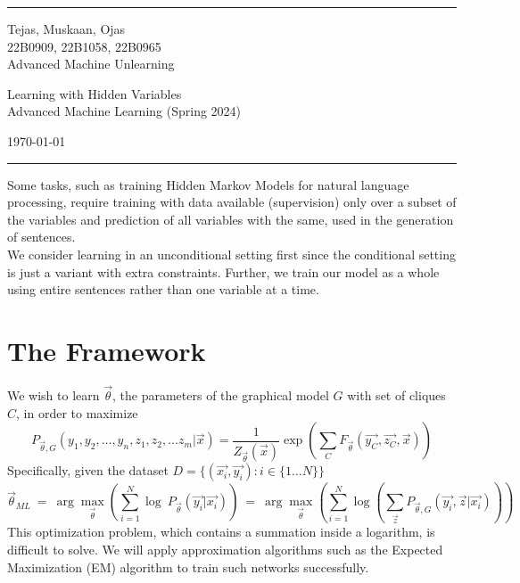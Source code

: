 \documentclass[a4paper]{article}
\begin{document}

\fancyhead[C]{}
\hrule \medskip %
\begin{minipage}{0.295\textwidth} 
\raggedright
\footnotesize
Tejas, Muskaan, Ojas \hfill\\   
22B0909, 22B1058, 22B0965\hfill\\
Advanced Machine Unlearning
\end{minipage}
\begin{minipage}{0.4\textwidth} 
\centering 
\large 
Learning with Hidden Variables\\ 
\normalsize 
Advanced Machine Learning (Spring 2024)\\ 
\end{minipage}
\begin{minipage}{0.295\textwidth} 
\raggedleft
\today\hfill\\
\end{minipage}
\medskip\hrule 
\bigskip


Some tasks, such as training Hidden Markov Models for natural language processing, require training with data available (supervision) only over a subset of the variables and prediction of all variables with the same, used in the generation of sentences. \hfill \\

We consider learning in an unconditional setting first since the conditional setting is just a variant with extra constraints. Further, we train our model as a whole using entire sentences rather than one variable at a time.

\section{The Framework}
We wish to learn $\vec{\theta}$, the parameters of the graphical model $G$ with set of cliques $C$, in order to maximize \[
P_{\vec{\theta}, G}\left( y_1, y_2, \dots, y_n, z_1, z_2, \dots z_m | \vec{x} \right) = 
\frac{1}{Z_{\vec{\theta}}(\vec{x})} \exp \left( \sum_{C} F_{\vec{\theta}}\left(\vec{y_C}, \vec{z_C}, \vec{x}\right) \right)
\] 
Specifically, given the dataset $D = \{ (\vec{x_i}, \vec{y_i}) : i \in \{ 1 \dots N \}  \}$  \[
\vec{\theta}_{ML}\ =\ 
\arg\max_{\vec{\theta}}\left( \sum_{i=1}^{N} \log\ P_{\vec{\theta}} ( \vec{y_i} | \vec{x_i} ) \right) \ =\  
\arg\max_{\vec{\theta}} \left( \sum_{i = 1}^{N} \log \left( \sum_{\vec{z}} P_{\vec{\theta}, G} ( \vec{y_i}, \vec{z} | \vec{x_i} ) \right) \right)
\]
This optimization problem, which contains a summation inside a logarithm, is difficult to solve. We will apply approximation algorithms such as the Expected Maximization (EM) algorithm to train such networks successfully.
\end{document}
